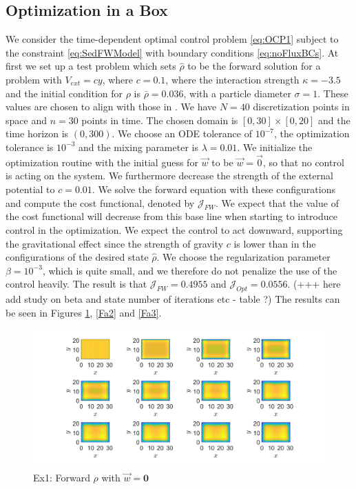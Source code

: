 \documentclass[final]{siamltex}
\newcommand{\w}{\vec{w}}
\newcommand{\hr}{\widehat \rho}
\begin{document}
\subsection{Optimization in a Box}
We consider the time-dependent optimal control problem \eqref{eq:OCP1} subject to the constraint \eqref{eq:SedFWModel} with boundary conditions \eqref{eq:noFluxBCs}.
At first we set up a test problem which sets $\hr$ to be the forward solution for a problem with $V_{ext} = cy$, where $c = 0.1$, where the interaction strength $\kappa = -3.5$ and the initial condition for $\rho$ is $\bar \rho = 0.036$, with a particle diameter $\sigma = 1$. These values are chosen to align with those in \cite{ArcherSed1}.
We have $N = 40$ discretization points in space and $n = 30$ points in time. The chosen domain is $[0,30] \times[0,20]$ and the time horizon is $(0,300)$. We choose an ODE tolerance of $10^{-7}$, the optimization tolerance is $10^{-3}$ and the mixing parameter is $\lambda = 0.01$. 
We initialize the optimization routine with the initial guess for $\w$ to be $\w = \vec 0$, so that no control is acting on the system. We furthermore decrease the strength of the external potential to $c = 0.01$. We solve the forward equation with these configurations and compute the cost functional, denoted by $\mathcal J_{FW}$. We expect that the value of the cost functional will decrease from this base line when starting to introduce control in the optimization.
We expect the control to act downward, supporting the gravitational effect since the strength of gravity $c$ is lower than in the configurations of the desired state $\hr$.
We choose the regularization parameter $\beta = 10^{-3}$, which is quite small, and we therefore do not penalize the use of the control heavily.
The result is that $\mathcal J_{FW} = 0.4955$ and $ \mathcal J_{Opt} = 0.0556$. (+++ here add study on beta and state number of iterations etc - table ?)
The results can be seen in Figures \ref{Fa1}, \ref{Fa2} and \ref{Fa3}.
\begin{figure}[h]
	\centering
	\includegraphics[scale=0.25]{F11.png}
	\caption{Ex1: Forward $\rho$ with $\w = \mathbf 0$} 
	\label{Fa1}
\end{figure}	
\end{document}
